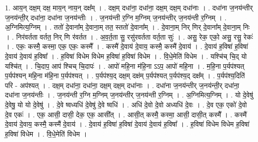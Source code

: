\documentclass[17pt]{extarticle}
\begin{document}
1. आय॒न् दक्ष॒म् दक्ष॒ माय॒न् नाय॒न् दक्ष᳚म् । . दक्ष॒म् दधा॑ना॒ दधा॑ना॒ दक्ष॒म् दक्ष॒म् दधा॑नाः । . दधा॑ना ज॒नय॑न्तीर् ज॒नय॑न्ती॒र् दधा॑ना॒ दधा॑ना ज॒नय॑न्तीः । . ज॒नय॑न्ती र॒ग्नि म॒ग्निम् ज॒नय॑न्तीर् ज॒नय॑न्ती र॒ग्निम् । . अ॒ग्निमित्य॒ग्निम् । . ततो॑ दे॒वाना᳚म् दे॒वाना॒म् तत॒ स्ततो॑ दे॒वाना᳚म् । . दे॒वाना॒म् निर् णिर् दे॒वाना᳚म् दे॒वाना॒म् निः । . निर॑वर्तता वर्तत॒ निर् णि र॑वर्तत । . अ॒व॒र्त॒ता सु॒ रसु॑रवर्तता वर्त॒ता सुः॑ । . असु॒ रेक॒ एको॒ असु॒ रसु॒ रेकः॑ । . एकः॒ कस्मै॒ कस्मा॒ एक॒ एकः॒ कस्मै᳚ । . कस्मै॑ दे॒वाय॑ दे॒वाय॒ कस्मै॒ कस्मै॑ दे॒वाय॑ । . दे॒वाय॑ ह॒विषा॑ ह॒विषा॑ दे॒वाय॑ दे॒वाय॑ ह॒विषा᳚ । . ह॒विषा॑ विधेम विधेम ह॒विषा॑ ह॒विषा॑ विधेम । . वि॒धे॒मेति॑ विधेम । . यश्चि॑च् चि॒द् यो यश्चि॑त् । . चि॒दाप॒ आप॑ श्चिच् चि॒दापः॑ । . आपो॑ महि॒ना म॑हि॒ना ऽऽप॒ आपो॑ महि॒ना । . म॒हि॒ना प॒र्यप॑श्यत् प॒र्यप॑श्यन् महि॒ना म॑हि॒ना प॒र्यप॑श्यत् । . प॒र्यप॑श्य॒द् दक्ष॒म् दक्ष॑म् प॒र्यप॑श्यत् प॒र्यप॑श्य॒द् दक्ष᳚म् । . प॒र्यप॑श्य॒दिति॑ परि - अप॑श्यत् । . दक्ष॒म् दधा॑ना॒ दधा॑ना॒ दक्ष॒म् दक्ष॒म् दधा॑नाः । . दधा॑ना ज॒नय॑न्तीर् ज॒नय॑न्ती॒र् दधा॑ना॒ दधा॑ना ज॒नय॑न्तीः । . ज॒नय॑न्ती र॒ग्नि म॒ग्निम् ज॒नय॑न्तीर् ज॒नय॑न्ती र॒ग्निम् । . अ॒ग्निमित्य॒ग्निम् । . यो दे॒वेषु॑ दे॒वेषु॒ यो यो दे॒वेषु॑ । . दे॒वे ष्वध्यधि॑ दे॒वेषु॑ दे॒वे ष्वधि॑ । . अधि॑ दे॒वो दे॒वो अध्यधि॑ दे॒वः । . दे॒व एक॒ एको॑ दे॒वो दे॒व एकः॑ । . एक॒ आसी॒ दासी॒ देक॒ एक॒ आसी᳚त् । . आसी॒त् कस्मै॒ कस्मा॒ आसी॒ दासी॒त् कस्मै᳚ । . कस्मै॑ दे॒वाय॑ दे॒वाय॒ कस्मै॒ कस्मै॑ दे॒वाय॑ । . दे॒वाय॑ ह॒विषा॑ ह॒विषा॑ दे॒वाय॑ दे॒वाय॑ ह॒विषा᳚ । . ह॒विषा॑ विधेम विधेम ह॒विषा॑ ह॒विषा॑ विधेम । . वि॒धे॒मेति॑ विधेम । \newline
\end{document}
